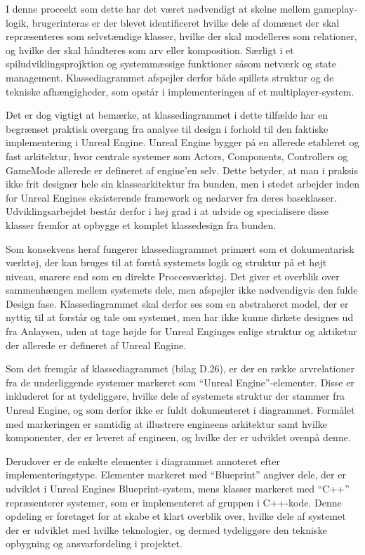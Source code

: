 I denne proceekt som dette har det været nødvendigt at skelne mellem gameplay-logik, brugerinteras er der blevet identificeret hvilke dele af domænet der skal repræsenteres som selvstændige klasser, hvilke der skal modelleres som relationer, og hvilke der skal håndteres som arv eller komposition. Særligt i et spiludviklingsprojktion og systemmæssige funktioner såsom netværk og state management. Klassediagrammet afspejler derfor både spillets struktur og de tekniske afhængigheder, som opstår i implementeringen af et multiplayer-system.

Det er dog vigtigt at bemærke, at klassediagrammet i dette tilfælde har en begrænset praktisk overgang fra analyse til design i forhold til den faktiske implementering i Unreal Engine. Unreal Engine bygger på en allerede etableret og fast arkitektur, hvor centrale systemer som Actors, Components, Controllers og GameMode allerede er defineret af engine’en selv. Dette betyder, at man i praksis ikke frit designer hele sin klassearkitektur fra bunden, men i stedet arbejder inden for Unreal Engines eksisterende framework og nedarver fra deres baseklasser. Udviklingsarbejdet består derfor i høj grad i at udvide og specialisere disse klasser fremfor at opbygge et komplet klassedesign fra bunden.

Som konsekvens heraf fungerer klassediagrammet primært som et dokumentarisk værktøj, der kan bruges til at forstå systemets logik og struktur på et højt niveau, snarere end som en direkte Proccesværktøj. Det giver et overblik over sammenhængen mellem systemets dele, men afspejler ikke nødvendigvis den fulde Design fase. Klassediagrammet skal derfor ses som en abstraheret model, der er nyttig til at forstår og tale om systemet, men har ikke kunne dirkete designes ud fra Anlaysen, uden at tage højde for Unreal Enginges enlige struktur og aktiketur der allerede 
er defineret af Unreal Engine.

Som det fremgår af klassediagrammet (bilag D.26), er der en række arvrelationer fra de underliggende systemer markeret som “Unreal Engine”-elementer. Disse er inkluderet for at tydeliggøre, hvilke dele af systemets struktur der stammer fra Unreal Engine, og som derfor ikke er fuldt dokumenteret i diagrammet. Formålet med markeringen er samtidig at illustrere engineens arkitektur samt hvilke komponenter, der er leveret af engineen, og hvilke der er udviklet ovenpå denne.

Derudover er de enkelte elementer i diagrammet annoteret efter implementeringstype. Elementer markeret med “Blueprint” angiver dele, der er udviklet i Unreal Engines Blueprint-system, mens klasser markeret med “C++” repræsenterer systemer, som er implementeret af gruppen i C++-kode. Denne opdeling er foretaget for at skabe et klart overblik over, hvilke dele af systemet der er udviklet med hvilke teknologier, og dermed tydeliggøre den tekniske opbygning og ansvarfordeling i projektet.

